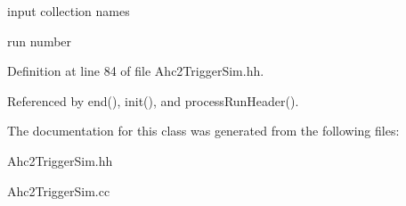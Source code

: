 input collection names 

run number 

Definition at line 84 of file Ahc2\-Trigger\-Sim.\-hh.



Referenced by end(), init(), and process\-Run\-Header().



The documentation for this class was generated from the following files\-:\begin{DoxyCompactItemize}
\item 
Ahc2\-Trigger\-Sim.\-hh\item 
Ahc2\-Trigger\-Sim.\-cc\end{DoxyCompactItemize}
